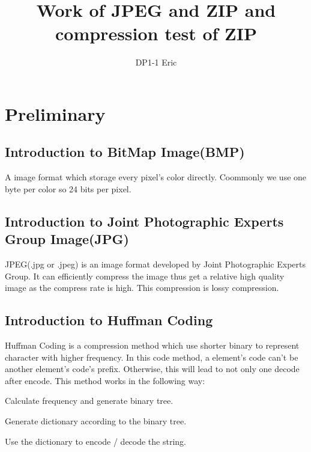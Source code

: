 \documentclass{article}
\begin{document}
%
%
%
%
%
\setlength{\parindent}{0pt}

\author{DP1-1 Eric}
\title{Work of JPEG and ZIP and compression test of ZIP}
\date{}


\maketitle

\newpage

\tableofcontents

\newpage

\section{Preliminary}
\subsection{Introduction to BitMap Image(BMP)}
A image format which storage every pixel's color directly. Coommonly we use one byte per color so 24 bits per pixel.

\subsection{Introduction to Joint Photographic Experts Group Image(JPG)}
JPEG(.jpg or .jpeg) is an image format developed by Joint Photographic Experts Group. It can efficiently compress the image thus get a relative high quality image as the compress rate is high. This compression is lossy compression. \cite{ref1}

\subsection{Introduction to Huffman Coding}
Huffman Coding is a compression method which use shorter binary to represent character with higher frequency. In this code method, a element's code can't be another element's code's prefix. Otherwise, this will lead to not only one decode after encode. This method works in the following way: \\
\item Calculate frequency and generate binary tree. \\
\item Generate dictionary according to the binary tree. \\
\item Use the dictionary to encode / decode the string. \\
\end{document}
